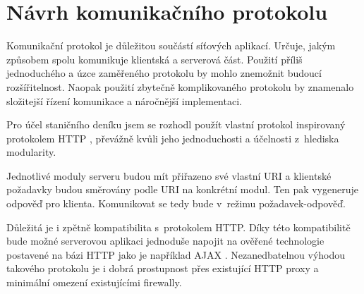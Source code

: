 \section{Návrh komunikačního protokolu}
\label{navrh_protokol}


Komunikační protokol je důležitou součástí síťových aplikací. Určuje, jakým
způsobem spolu komunikuje
klientská a serverová část. Použití příliš jednoduchého a úzce zaměřeného
protokolu by mohlo znemožnit budoucí rozšířitelnost. Naopak použití zbytečně
komplikovaného protokolu by znamenalo složitejší řízení komunikace a náročnější
implementaci.

Pro účel staničního deníku jsem se rozhodl použít vlastní protokol inspirovaný protokolem HTTP \cite{http},
převážně kvůli jeho jednoduchosti a účelnosti z~hlediska modularity.

Jednotlivé moduly serveru budou mít přiřazeno své vlastní URI a klientské
požadavky budou směrovány podle URI na konkrétní modul.
Ten pak vygeneruje odpověď pro klienta. Komunikovat se tedy bude v~režimu požadavek-odpověď.

Důležitá je i zpětně kompatibilita s~protokolem HTTP. Díky této kompatibilitě
bude možné serverovou aplikaci jednoduše napojit na ověřené technologie postavené na bázi HTTP jako je například
AJAX \cite{ajax}. Nezanedbatelnou výhodou takového protokolu je i dobrá prostupnost přes
existující HTTP proxy a minimální omezení existujícími firewally.


